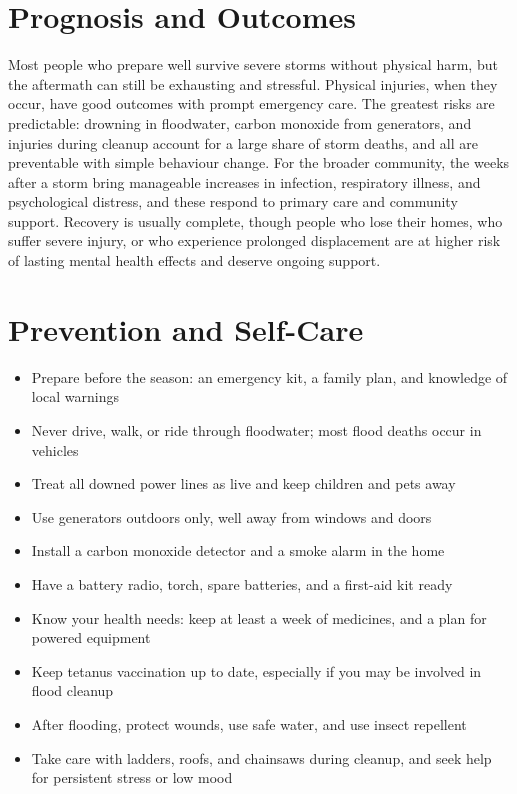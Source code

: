 \section*{Prognosis and Outcomes}
Most people who prepare well survive severe storms without physical harm, but the aftermath can still be exhausting and stressful. Physical injuries, when they occur, have good outcomes with prompt emergency care. The greatest risks are predictable: drowning in floodwater, carbon monoxide from generators, and injuries during cleanup account for a large share of storm deaths, and all are preventable with simple behaviour change. For the broader community, the weeks after a storm bring manageable increases in infection, respiratory illness, and psychological distress, and these respond to primary care and community support. Recovery is usually complete, though people who lose their homes, who suffer severe injury, or who experience prolonged displacement are at higher risk of lasting mental health effects and deserve ongoing support.

\section*{Prevention and Self-Care}
\begin{itemize}
    \item Prepare before the season: an emergency kit, a family plan, and knowledge of local warnings
    \item Never drive, walk, or ride through floodwater; most flood deaths occur in vehicles
    \item Treat all downed power lines as live and keep children and pets away
    \item Use generators outdoors only, well away from windows and doors
    \item Install a carbon monoxide detector and a smoke alarm in the home
    \item Have a battery radio, torch, spare batteries, and a first-aid kit ready
    \item Know your health needs: keep at least a week of medicines, and a plan for powered equipment
    \item Keep tetanus vaccination up to date, especially if you may be involved in flood cleanup
    \item After flooding, protect wounds, use safe water, and use insect repellent
    \item Take care with ladders, roofs, and chainsaws during cleanup, and seek help for persistent stress or low mood
\end{itemize}

